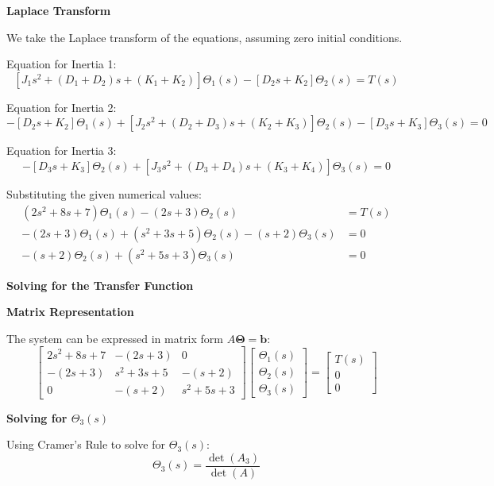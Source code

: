 \documentclass[11pt]{article}
\begin{document}
\newpage
\noindent\textbf{Laplace Transform}

\vspace{12pt}

We take the Laplace transform of the equations, assuming zero initial conditions.

\vspace{8pt}

Equation for Inertia 1:
\[
[J_1 s^2 + (D_1 + D_2)s + (K_1 + K_2)]\Theta_1(s) - [D_2s + K_2]\Theta_2(s) = T(s)
\]

Equation for Inertia 2:
\[
-[D_2s + K_2]\Theta_1(s) + [J_2 s^2 + (D_2 + D_3)s + (K_2 + K_3)]\Theta_2(s) - [D_3s + K_3]\Theta_3(s) = 0
\]

Equation for Inertia 3:
\[
-[D_3s + K_3]\Theta_2(s) + [J_3 s^2 + (D_3 + D_4)s + (K_3 + K_4)]\Theta_3(s) = 0
\]

Substituting the given numerical values:
\begin{align}
    (2s^2 + 8s + 7)\Theta_1(s) - (2s + 3)\Theta_2(s) &= T(s) \tag{1} \\
    -(2s + 3)\Theta_1(s) + (s^2 + 3s + 5)\Theta_2(s) - (s + 2)\Theta_3(s) &= 0 \tag{2} \\
    -(s + 2)\Theta_2(s) + (s^2 + 5s + 3)\Theta_3(s) &= 0 \tag{3}
\end{align}

\noindent\textbf{Solving for the Transfer Function}
\vspace{8pt}

\noindent\textbf{Matrix Representation}

The system can be expressed in matrix form $A\boldsymbol{\Theta} = \mathbf{b}$:
$$
\begin{bmatrix}
2s^2 + 8s + 7 & -(2s + 3) & 0 \\
-(2s + 3) & s^2 + 3s + 5 & -(s + 2) \\
0 & -(s + 2) & s^2 + 5s + 3
\end{bmatrix}
\begin{bmatrix}
\Theta_1(s) \\
\Theta_2(s) \\
\Theta_3(s)
\end{bmatrix}
=
\begin{bmatrix}
T(s) \\
0 \\
0
\end{bmatrix}
$$

\noindent\textbf{Solving for $\Theta_3(s)$}

Using Cramer's Rule to solve for $\Theta_3(s)$:
$$ \Theta_3(s) = \frac{\det(A_3)}{\det(A)} $$
\end{document}
